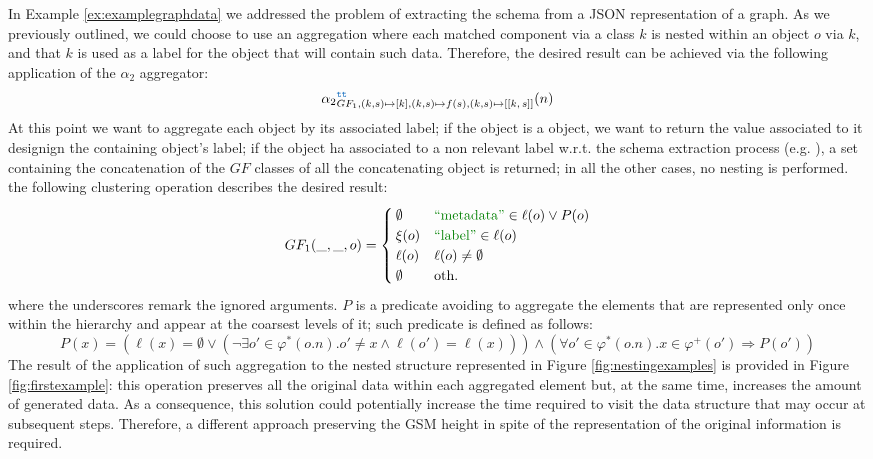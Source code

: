 \begin{example}[label=ex:aggregations]
In Example \vref{ex:examplegraphdata} we addressed the problem of extracting the schema from a JSON representation of a graph. As we previously outlined, we could choose to use an aggregation where each matched component via a class $k$ is nested within an object $o$ via $k$, and that $k$ is used as a label for the object that will contain such data. Therefore, the desired result can be achieved via the following application of the $\alpha_2$ aggregator:
\[{\alpha_2}_{GF_1,(k,s)\mapsto [k], (k,s)\mapsto f(s), (k,s)\mapsto[[k,\, s]]}^{\texttt{\color{RoyalBlue}tt}}(n)\]
At this point we want to aggregate each object by its associated label; if the object is a  object, we want to return the value associated to it designign the containing object's label; if the object ha associated to a non relevant label w.r.t. the schema extraction process (e.g. ), a set containing the concatenation of the $GF$ classes of all the concatenating object is returned; in all the other cases, no nesting is performed. the following clustering operation describes the desired result:
\begin{equation}
\label{eq:GF1}
GF_1(\_, \_, o)=\begin{cases}
\emptyset & \mstr{metadata}\in\ell(o)\vee P(o)\\
\xi(o) & \mstr{label}\in\ell(o)\\
\ell(o) & \ell(o)\neq \emptyset\\
\emptyset & \textup{oth.}\\
\end{cases}
\end{equation}
where the underscores remark the ignored arguments.  $P$ is a predicate avoiding to aggregate the elements that are represented only once within the hierarchy and appear at the coarsest levels of it; such predicate is defined as follows:
\[P(x)=(\ell(x)=\emptyset\vee (\neg\exists o'\in\varphi^*(o.n). o'\neq x\wedge \ell(o')=\ell(x)))\wedge(\forall o'\in\varphi^*(o.n).x\in\varphi^+(o')\Rightarrow P(o'))\]
The result of the application of such aggregation to the nested structure represented in Figure \ref{fig:nestingexamples} is provided in Figure \ref{fig:firstexample}: this operation preserves all the original data within each aggregated element but, at the same time, increases the amount of generated data. As a consequence, this solution could potentially increase the time required to visit the data structure that may occur at subsequent steps. Therefore, a different approach preserving the GSM height in spite of the representation of the original information is required.
\end{example}

